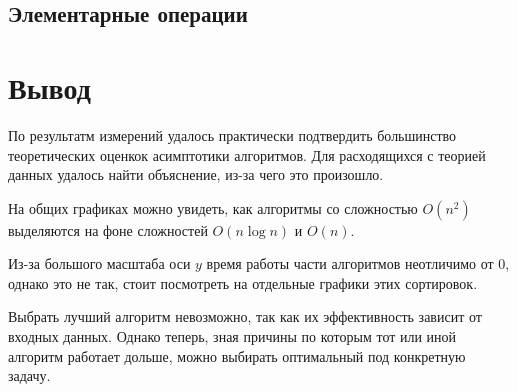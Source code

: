 \documentclass[11pt]{article}
\begin{document}
\subsection{Элементарные операции}

\begin{center}
\end{center}
{ \hspace*{\fill} }

\begin{center}
\end{center}
{ \hspace*{\fill} }

\newpage

\setcounter{section}{18}
\section*{\centering Вывод}

По результатм измерений удалось практически подтвердить большинство теоретических оценкок
асимптотики алгоритмов. Для расходящихся с теорией данных удалось найти объяснение, из-за чего
это произошло.

На общих графиках можно увидеть, как алгоритмы со сложностью $O(n^2)$ выделяются на фоне 
сложностей $O(n\log n)$ и $O(n)$.

Из-за большого масштаба оси $y$ время работы части алгоритмов
неотличимо от $0$, однако это не так, стоит посмотреть на отдельные графики этих сортировок.

Выбрать лучший алгоритм невозможно, так как их эффективность зависит от входных данных.
Однако теперь, зная причины по которым тот или иной алгоритм работает дольше, можно выбирать
оптимальный под конкретную задачу.
\end{document}
